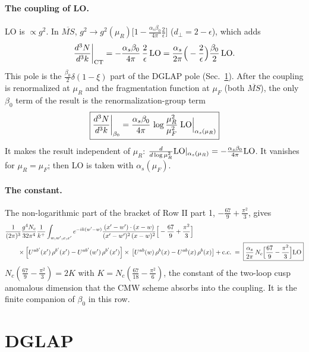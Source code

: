 \documentclass[10pt]{article}
\numberwithin{equation}{section}
\begin{document}
\paragraph{The coupling of LO.} LO is $\propto g^2$. In $\overline{MS}$, $g^2\to g^2(\mu_R)\big[1-\frac{\alpha_s\beta_0}{4\pi}\frac{2}{\epsilon}\big]$ ($d_\perp=2-\epsilon$), which adds
\begin{equation}
\frac{d^3N}{d^3k}\bigg|_{\rm CT}=-\frac{\alpha_s\beta_0}{4\pi}\,\frac{2}{\epsilon}\,{\rm LO}=\frac{\alpha_s}{2\pi}\Big(-\frac{2}{\epsilon}\Big)\frac{\beta_0}{2}\,{\rm LO}.
\label{eq:ct}
\end{equation}
This pole is the $\frac{\beta_0}{2}\delta(1-\xi)$ part of the DGLAP pole (Sec.~\ref{sec:dglap}). After the coupling is renormalized at $\mu_R$ and the fragmentation function at $\mu_F$ (both $\overline{MS}$), the only $\beta_0$ term of the result is the renormalization-group term
\begin{equation}
\boxed{\frac{d^3N}{d^3k}\bigg|_{\beta_0}=\frac{\alpha_s\beta_0}{4\pi}\,\log\frac{\mu_R^2}{\mu_F^2}\;{\rm LO}\Big|_{\alpha_s(\mu_R)}}
\label{eq:rg}
\end{equation}
It makes the result independent of $\mu_R$: $\frac{d}{d\log\mu_R^2}{\rm LO}|_{\alpha_s(\mu_R)}=-\frac{\alpha_s\beta_0}{4\pi}{\rm LO}$. It vanishes for $\mu_R=\mu_F$; then LO is taken with $\alpha_s(\mu_F)$.

\paragraph{The constant.} The non-logarithmic part of the bracket of Row II part 1, $-\frac{67}{9}+\frac{\pi^2}{3}$, gives
\begin{align}
&\frac{1}{(2\pi)^{3}}\frac{g^{4}N_{c}}{32\pi^{4}}\frac{1}{k^{+}}\int_{w,w',x,x'}e^{-ik(w'-w)}\frac{(x'-w')\cdot (x-w)}{(x'-w')^{2}\, (x-w)^{2}}\Big[-\frac{67}{9}+\frac{\pi^{2}}{3}\Big]\notag\\
&\qquad\times\left[U^{ab'}(x')\,\rho^{b'}(x') - U^{ab'}(w')\,\rho^{b'}(x')\right]\times\,\left[U^{ab}(w)\,\rho^{b}(x) - U^{ab}(x)\,\rho^{b}(x)\right]+{\rm c.c.}\;=\;\boxed{\frac{\alpha_s}{2\pi}\,N_c\Big[\frac{67}{9}-\frac{\pi^2}{3}\Big]{\rm LO}}
\label{eq:cmw}
\end{align}
$N_c(\frac{67}{9}-\frac{\pi^2}{3})=2K$ with $K=N_c(\frac{67}{18}-\frac{\pi^2}{6})$, the constant of the two-loop cusp anomalous dimension that the CMW scheme absorbs into the coupling. It is the finite companion of $\beta_0$ in this row.

\section{DGLAP}\label{sec:dglap}
\end{document}
